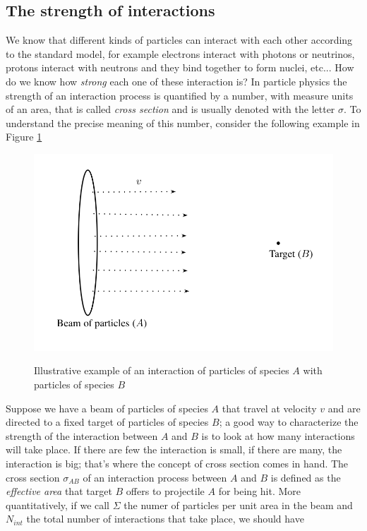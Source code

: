 \subsection{The strength of interactions}
We know that different kinds of particles can interact with each other according to the standard model, for example electrons interact with photons or neutrinos, protons interact with neutrons and they bind together to form nuclei, etc... How do we know how \textit{strong} each one of these interaction is? In particle physics the strength of an interaction process is quantified by a number, with measure units of an area, that is called \textit{cross section} and is usually denoted with the letter $\sigma$. To understand the precise meaning of this number, consider the following example in Figure \ref{crossec}
\begin{figure}
\begin{center}
\includegraphics[scale=0.7]{Draw/cross_section.png}
\label{}
\end{center}
\caption{Illustrative example of an interaction of particles of species $A$ with particles of species $B$}
\label{crossec}
\end{figure}
Suppose we have a beam of particles of species $A$ that travel at velocity $v$ and are directed to a fixed target of particles of species $B$; a good way to characterize the strength of the interaction between $A$ and $B$ is to look at how many interactions will take place. If there are few the interaction is small, if there are many, the interaction is big; that's where the concept of cross section comes in hand. The cross section $\sigma_{AB}$ of an interaction process between $A$ and $B$ is defined as the \textit{effective area} that target $B$ offers to projectile $A$ for being hit. More quantitatively, if we call $\Sigma$ the numer of particles per unit area in the beam and $N_{int}$ the total number of interactions that take place, we should have
